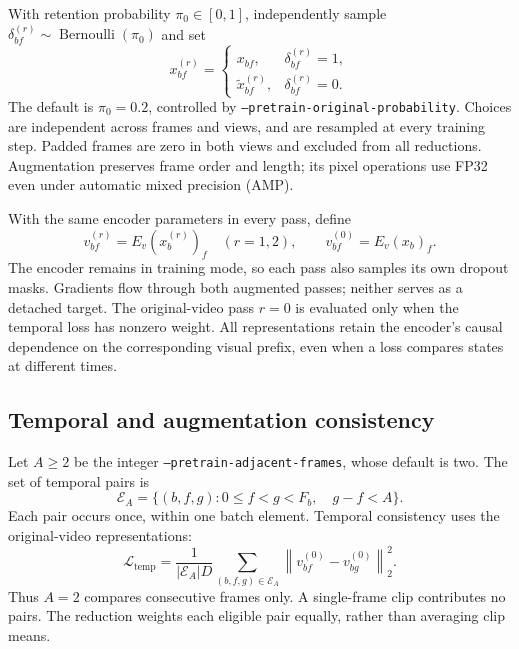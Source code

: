 \documentclass[11pt,a4paper]{article}
\newcommand{\norm}[1]{\left\lVert #1\right\rVert}
\numberwithin{equation}{section}
\begin{document}
With retention probability $\pi_0\in[0,1]$, independently sample
$\delta_{bf}^{(r)}\sim\operatorname{Bernoulli}(\pi_0)$ and set
\begin{equation}
x_{bf}^{(r)}=
\begin{cases}
x_{bf},&\delta_{bf}^{(r)}=1,\\
\widetilde x_{bf}^{(r)},&\delta_{bf}^{(r)}=0.
\end{cases}
\end{equation}
The default is $\pi_0=0.2$, controlled by
\texttt{--pretrain-original-probability}. Choices are independent across
frames and views, and are resampled at every training step. Padded frames
are zero in both views and excluded from all reductions. Augmentation
preserves frame order and length; its pixel operations use FP32 even
under automatic mixed precision (AMP).

With the same encoder parameters in every pass, define
\begin{equation}
v_{bf}^{(r)}=E_v(x_b^{(r)})_f\quad(r=1,2),\qquad
v_{bf}^{(0)}=E_v(x_b)_f.
\end{equation}
The encoder remains in training mode, so each pass also samples its own
dropout masks. Gradients flow through both augmented passes; neither
serves as a detached target. The original-video pass $r=0$ is evaluated
only when the temporal loss has nonzero weight. All representations
retain the encoder's causal dependence on the corresponding visual
prefix, even when a loss compares states at different times.

\subsection{Temporal and augmentation consistency}

Let $A\geq2$ be the integer \texttt{--pretrain-adjacent-frames},
whose default is two. The set of temporal pairs is
\begin{equation}
\mathcal E_A
=\{(b,f,g):0\leq f<g<F_b,\quad g-f<A\}.
\end{equation}
Each pair occurs once, within one batch element. Temporal consistency
uses the original-video representations:
\begin{equation}
\mathcal L_{\mathrm{temp}}
=\frac{1}{|\mathcal E_A|D}
  \sum_{(b,f,g)\in\mathcal E_A}
  \norm{v_{bf}^{(0)}-v_{bg}^{(0)}}_2^2.
\label{eq:pretrain-temporal}
\end{equation}
Thus $A=2$ compares consecutive frames only. A single-frame clip
contributes no pairs. The reduction weights each eligible pair equally,
rather than averaging clip means.
\end{document}
